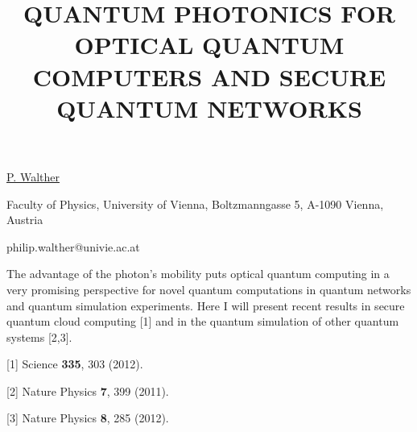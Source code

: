 \title{QUANTUM PHOTONICS FOR OPTICAL QUANTUM COMPUTERS AND SECURE QUANTUM NETWORKS}

\underline{P. Walther}

{\normalsize{

\vspace{-4mm} Faculty of Physics, University of Vienna, Boltzmanngasse 5, A-1090 Vienna, Austria

\email philip.walther@univie.ac.at}}

The advantage of the photon's mobility puts optical quantum computing in a very promising perspective for novel quantum computations in quantum networks and quantum simulation experiments. Here I will present recent results in secure quantum cloud computing [1] and in the quantum simulation of other quantum systems [2,3].

{\normalsize
[1] Science \textbf{335}, 303 (2012).
\vsp

[2] Nature Physics \textbf{7}, 399 (2011).
\vsp

[3] Nature Physics \textbf{8}, 285 (2012).
}

\vspace{\baselineskip}
